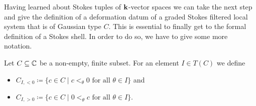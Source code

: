 Having learned about Stokes tuples of $\mathbf{k}$-vector spaces we can take the next step and give the definition of a deformation datum of a graded Stokes filtered local system that is of Gaussian type $C$. This is essential to finally get to the formal definition of a Stokes shell. In order to do so, we have to give some more notation.
\newline


Let $C\subseteq \mathbb{C}$ be a non-empty, finite subset. For an element $I \in T(C)$ we define
\begin{itemize}
\item $C_{I, <0} \coloneqq \{c \in C \mid c<_{\theta} 0 \text{ for all } \theta \in I\}$ and 
\item $C_{I, >0} \coloneqq \{c \in C \mid 0<_{\theta} c \text{ for all } \theta \in I\}$.
\end{itemize}

